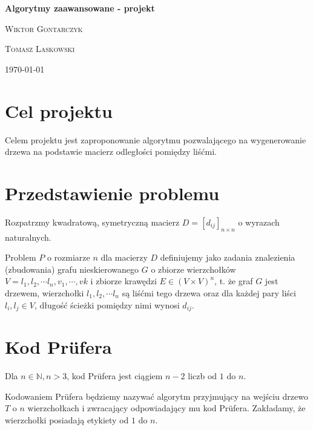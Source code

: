 \documentclass[a4paper,12p]{article}
\begin{document}
\begin{titlepage}
	\begin{center}
	
	{\huge\bfseries Algorytmy zaawansowane - projekt\par}
	\vspace{1cm}
	{\Large\scshape Wiktor Gontarczyk\par}
	{\Large\scshape Tomasz Laskowski\par}
	\vspace{2cm}

	\today
	\vspace{1cm}	
	
	\end{center}
\end{titlepage}

\tableofcontents

\newpage

\section{Cel projektu}

Celem projektu jest zaproponowanie algorytmu pozwalającego na wygenerowanie drzewa na podstawie macierz odległości pomiędzy liśćmi.


\section{Przedstawienie problemu}

Rozpatrzmy kwadratową, symetryczną macierz $D=[d_{ij}]_{n \times n}$ o wyrazach naturalnych. 

Problem $P$ o rozmiarze $n$ dla macierzy $D$ definiujemy jako zadania znalezienia (zbudowania) grafu nieskierowanego $G$ o zbiorze wierzchołków $V = l_1, l_2, \cdots l_n, v_{1}, \cdots, v{k}$ i zbiorze krawędzi $E \in (V \times V)^n$, t. że graf $G$ jest drzewem, wierzchołki $l_1, l_2, \cdots l_n$ są liśćmi tego drzewa oraz dla każdej pary liści $l_i, l_j \in V$, długość ścieżki pomiędzy nimi wynosi $d_{ij}$.

\section{Kod Prüfera}

Dla $n \in \mathbb{N}, n > 3$, kod Prüfera jest ciągiem $n - 2$ liczb od $1$ do $n$.

Kodowaniem Prüfera będziemy nazywać algorytm przyjmujący na wejściu drzewo $T$ o $n$ wierzchołkach i zwracający odpowiadający mu kod Prüfera. Zakładamy, że wierzchołki posiadają etykiety od $1$ do $n$.
\end{document}
